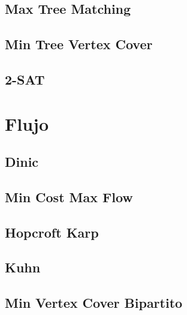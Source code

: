 \documentclass[a4paper,11pt,landscape,twocolumn]{article}
\begin{document}
\subsection{Max Tree Matching}



\subsection{Min Tree Vertex Cover}



\subsection{2-SAT}



\section{Flujo}

\subsection{Dinic}



\subsection{Min Cost Max Flow}



\subsection{Hopcroft Karp}



\subsection{Kuhn}



\subsection{Min Vertex Cover Bipartito}
\end{document}

